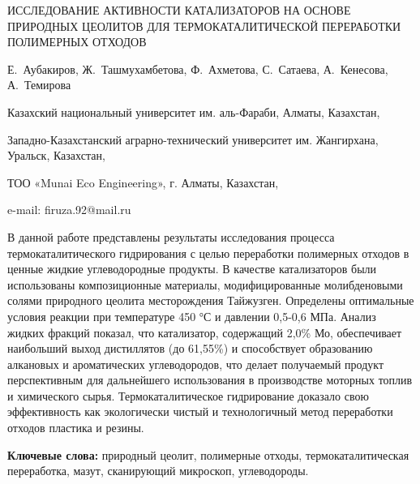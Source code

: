 \begin{header}
ИССЛЕДОВАНИЕ АКТИВНОСТИ КАТАЛИЗАТОРОВ НА ОСНОВЕ ПРИРОДНЫХ ЦЕОЛИТОВ ДЛЯ ТЕРМОКАТАЛИТИЧЕСКОЙ ПЕРЕРАБОТКИ ПОЛИМЕРНЫХ ОТХОДОВ

Е.~Аубакиров,
Ж.~Ташмухамбетова,
Ф.~Ахметова\envelope,
С.~Сатаева,
А.~Кенесова,
А.~Темирова
\end{header}

\begin{affil}
Казахский национальный университет им. аль-Фараби, Алматы, Казахстан,

Западно-Казахстанский аграрно-технический университет им. Жангирхана, Уральск, Казахстан,

ТОО «Munai Eco Engineering», г. Алматы, Казахстан,

e-mail: firuza.92@mail.ru
\end{affil}

В данной работе представлены результаты исследования процесса
термокаталитического гидрирования с целью переработки полимерных отходов
в ценные жидкие углеводородные продукты. В качестве катализаторов были
использованы композиционные материалы, модифицированные молибденовыми
солями природного цеолита месторождения Тайжузген. Определены
оптимальные условия реакции при температуре 450 °С и давлении 0,5-0,6
МПа. Анализ жидких фракций показал, что катализатор, содержащий 2,0\%
Мо, обеспечивает наибольший выход дистиллятов (до 61,55\%) и
способствует образованию алкановых и ароматических углеводородов, что
делает получаемый продукт перспективным для дальнейшего использования в
производстве моторных топлив и химического сырья. Термокаталитическое
гидрирование доказало свою эффективность как экологически чистый и
технологичный метод переработки отходов пластика и резины.

{\bfseries Ключевые слова:} природный цеолит, полимерные отходы,
термокаталитическая переработка, мазут, сканирующий микроскоп,
углеводороды.

